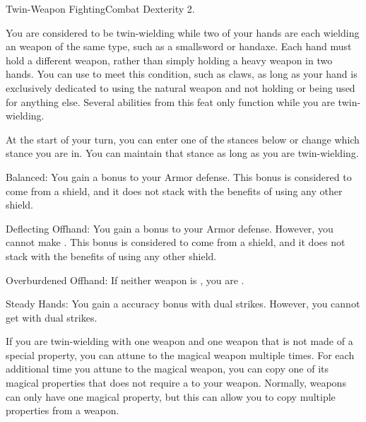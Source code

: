   \begin{feat}{Twin-Weapon Fighting}{Combat}
    \featpre Dexterity 2.

     You are considered to be twin-wielding while two of your hands are each wielding an weapon of the same type, such as a smallsword or handaxe.
    Each hand must hold a different weapon, rather than simply holding a heavy weapon in two hands.
    You can use  to meet this condition, such as claws, as long as your hand is exclusively dedicated to using the natural weapon and not holding or being used for anything else.
    Several abilities from this feat only function while you are twin-wielding.

     At the start of your turn, you can enter one of the stances below or change which stance you are in.
    You can maintain that stance as long as you are twin-wielding.
    \begin{raggeditemize}
      \item Balanced: You gain a  bonus to your Armor defense.
        This bonus is considered to come from a shield, and it does not stack with the benefits of using any other shield.
      \item Deflecting Offhand: You gain a  bonus to your Armor defense.
        However, you cannot make .
        This bonus is considered to come from a shield, and it does not stack with the benefits of using any other shield.
      \item Overburdened Offhand: If neither weapon is , you are \empowered.
      \item Steady Hands: You gain a  accuracy bonus with dual strikes.
        However, you cannot get  with dual strikes.
    \end{raggeditemize}

     If you are twin-wielding with one \magical weapon and one  weapon that is not made of a special property, you can attune to the magical weapon multiple times.
    For each additional time you attune to the magical weapon, you can copy one of its magical properties that does not require a  to your  weapon.
    Normally, weapons can only have one magical property, but this can allow you to copy multiple properties from a  weapon.


\end{feat}
